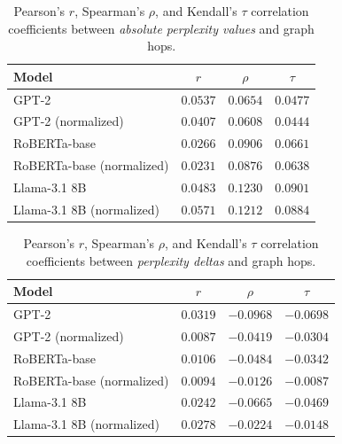 \documentclass[11pt]{article}
\begin{document}
\begin{table}
  \centering
  \begin{tabular}{l c c c}
    \toprule
    Model & $r$ & $\rho$ & $\tau$ \\
    \midrule
    GPT-2 & $0.0537$ & $0.0654$ & $0.0477$ \\
    GPT-2 (normalized) & $0.0407$ & $0.0608$ & $0.0444$ \\
    RoBERTa-base & $0.0266$ & $0.0906$ & $0.0661$ \\
    RoBERTa-base (normalized) & $0.0231$ & $0.0876$ & $0.0638$ \\
    Llama-3.1 8B & $0.0483$ & $0.1230$ & $0.0901$ \\
    Llama-3.1 8B (normalized) & $0.0571$ & $0.1212$ & $0.0884$ \\
    \bottomrule
  \end{tabular}
  \caption{Pearson's $r$, Spearman's $\rho$, and Kendall's $\tau$ correlation coefficients between \emph{absolute perplexity values} and graph hops.}
  \label{correlations_raw}
\end{table}

\begin{table}
  \centering
  \begin{tabular}{l c c c}
    \toprule
    Model & $r$ & $\rho$ & $\tau$ \\
    \midrule
    GPT-2 & $0.0319$ & $-0.0968$ & $-0.0698$ \\
    GPT-2 (normalized) & $0.0087$ & $-0.0419$ & $-0.0304$ \\
    RoBERTa-base & $0.0106$ & $-0.0484$ & $-0.0342$ \\
    RoBERTa-base (normalized) & $0.0094$ & $-0.0126$ & $-0.0087$ \\
    Llama-3.1 8B & $0.0242$ & $-0.0665$ & $-0.0469$ \\
    Llama-3.1 8B (normalized) & $0.0278$ & $-0.0224$ & $-0.0148$ \\
    \bottomrule
  \end{tabular}
  \caption{Pearson's $r$, Spearman's $\rho$, and Kendall's $\tau$ correlation coefficients between \emph{perplexity deltas} and graph hops.}
  \label{correlations_deltas}
\end{table}
\end{document}

